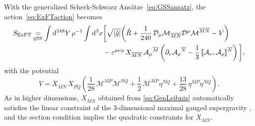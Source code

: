 \documentclass[a4paper, 11pt]{article}
\numberwithin{equation}{section}
\newcommand{\ov}[1]{\overline{#1}}
\newcommand{\+}{\oplus}
\newcommand{\fl}[1]{\ov{#1}}
\newcommand{\M}{\ensuremath{\mathcal{M}}\xspace}
\newcommand{\A}{\ensuremath{\mathcal{A}}\xspace}
\renewcommand{\d}{\ensuremath{\mathrm{d}}\xspace}
\begin{document}
With the generalized Scherk-Schwarz Ansätze~\eqref{eq:GSSansatz}, the action~\eqref{eq:ExFTaction} becomes
\begin{equation} \label{eq:ExFTactiongSS}
	\begin{aligned}
		S_{\rm ExFT} \underset{\rm gSS}{=} \int\d^{248}Y\,\rho^{-1}\int \d^{3}x & \bigg[\sqrt{\vert\mathring{g}\vert}\bigg(\mathring{R}+\frac{1}{240}\,{\cal D}_{\mu}\M_{\fl{MN}}{\cal D}^{\mu}\M^{\fl{MN}}-V\bigg) \\
		&-\varepsilon^{\mu\nu\rho}\,X_{\fl{MN}}\,\A_{\mu}{}^{\fl{M}} \left(\partial_{\nu}\A_{\rho}{}^{\fl{N}}-\frac{1}{3}\,\llbracket\A_{\nu},\A_{\rho}\rrbracket^{\fl{N}}\right)\bigg],
	\end{aligned}
\end{equation}
with the potential%
\begin{equation} \label{eq:3dpotential}
	V = X_{\fl{MN}}\,X_{\fl{PQ}}\left(\frac{1}{28}\,\M^{\fl{MP}}\M^{\fl{NQ}}+\frac{1}{2}\,\M^{\fl{MP}}\eta^{\fl{NQ}}+\frac{13}{28}\,\eta^{\fl{MP}}\eta^{\fl{NQ}}\right).
\end{equation}
As in higher dimensions, $X_{\ov{M}\ov{N}}$ obtained from \eqref{eq:GenLeibniz} automatically satisfies the linear constraint of the 3-dimensional maximal gauged supergravity \cite{Nicolai:2000sc,Nicolai:2001sv}, and the section condition implies the quadratic constraints for $X_{\ov{M}\ov{N}}$.
\end{document}
